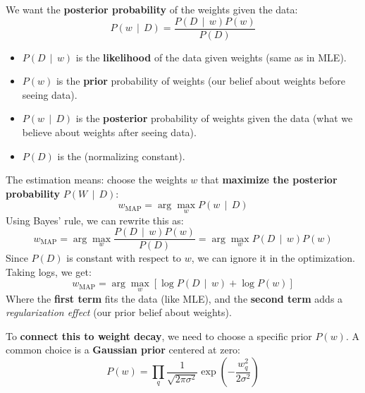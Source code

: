 \begin{itemize}
    \highspace
    We want the \textbf{posterior probability} of the weights given the data:
    \begin{equation*}
        P\left(w \, \mid \, D\right) = \dfrac{P\left(D \, \mid \, w\right) P\left(w\right)}{P\left(D\right)}
    \end{equation*}
    \begin{itemize}
        \item $P\left(D \, \mid \, w\right)$ is the \textbf{likelihood} of the data given weights (same as in MLE).
        \item $P\left(w\right)$ is the \textbf{prior} probability of weights (our belief about weights before seeing data).
        \item $P\left(w \, \mid \, D\right)$ is the \textbf{posterior} probability of weights given the data (what we believe about weights after seeing data).
        \item $P\left(D\right)$ is the  (normalizing constant).
    \end{itemize}
    The  estimation means: choose the weights $w$ that \textbf{maximize the posterior probability} $P\left(W \, \mid \, D\right)$:
    \begin{equation*}
        w_{\text{MAP}} = \arg\max_{w} P\left(w \, \mid \, D\right)
    \end{equation*}
    Using Bayes' rule, we can rewrite this as:
    \begin{equation*}
        w_{\text{MAP}} = \arg\max_{w} \dfrac{P\left(D \, \mid \, w\right) P\left(w\right)}{P\left(D\right)} = \arg\max_{w} P\left(D \, \mid \, w\right) P\left(w\right)
    \end{equation*}
    Since $P(D)$ is constant with respect to $w$, we can ignore it in the optimization. Taking logs, we get:
    \begin{equation*}
        w_{\text{MAP}} = \arg\max_{w} \left[ \log P\left(D \, \mid \, w\right) + \log P\left(w\right) \right]
    \end{equation*}
    Where the \textbf{first term} fits the data (like MLE), and the \textbf{second term} adds a \emph{regularization effect} (our prior belief about weights).
\end{itemize}
To \textbf{connect this to weight decay}, we need to choose a specific prior $P(w)$. A common choice is a \textbf{Gaussian prior} centered at zero:
\begin{equation*}
    P\left(w\right) = \prod_{q} \dfrac{1}{\sqrt{2 \pi \sigma^2}} \exp\left(-\dfrac{w_q^2}{2 \sigma^2}\right)
\end{equation*}
